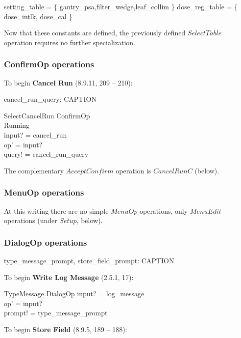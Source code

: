 \documentclass{article}
\begin{document}
\begin{zed}
	setting\_table = \{ gantry\_psa,filter\_wedge,leaf\_collim \}
\also
	dose\_reg\_table = \{ dose\_intlk, dose\_cal \}
\end{zed}
Now that these constants are defined, the previously defined
$SelectTable$ operation requires no further specialization.

\subsubsection{ConfirmOp operations}

To begin {\bf Cancel Run} (8.9.11, 209 -- 210):

\begin{axdef}
	cancel\_run\_query: CAPTION
\end{axdef}

\begin{schema}{SelectCancelRun}
	ConfirmOp \\
\where	
	Running \\
	input? = cancel\_run \\
	op' = input? \\
	query! = cancel\_run\_query
\end{schema}
The complementary $AcceptConfirm$ operation is $CancelRunC$ (below).

\subsubsection{MenuOp operations}

At this writing there are no simple $MenuOp$ operations, only
$MenuEdit$ operations (under $Setup$, below).

\subsubsection{DialogOp operations}


\begin{axdef}
	type\_message\_prompt, store\_field\_prompt: CAPTION
\end{axdef}

To begin {\bf Write Log Message} (2.5.1, 17):

\begin{schema}{TypeMessage}
	DialogOp
\where
	input? = log\_message \\
	op' = input?  \\
	prompt! = type\_message\_prompt
\end{schema}
To begin {\bf Store Field} (8.9.5, 189 -- 188):
\end{document}
